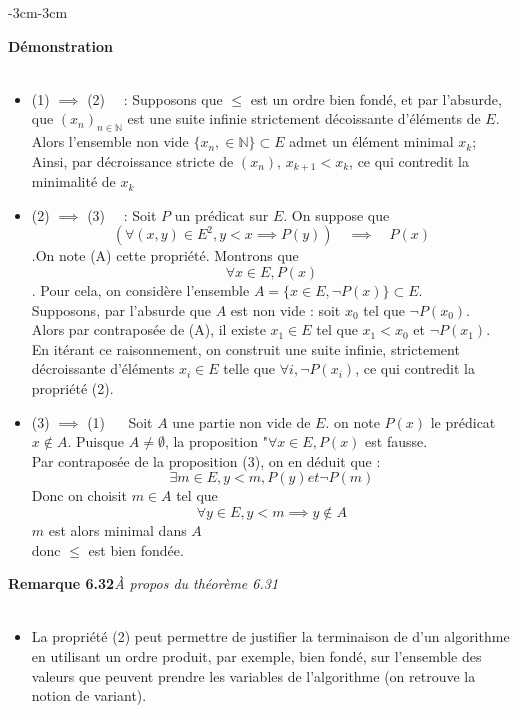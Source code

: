\documentclass{article}
\newenvironment{demonstration}
{
    \begin{boite_demonstration}
    \textbf{\textcolor{rouge_fonce}{Démonstration}}\\ \\
}
{
    \end{boite_demonstration}
    \vspace{15pt}
}
\newenvironment{remarque}[2]
{
    \begin{boite_remarque}
    \textbf{\textcolor{bleu_fonce}{Remarque #1}}\textit{#2} \\ \\
    \begin{itemize}[label=$\blacktriangleright \quad $ ]                    
}
{   
    \end{itemize}
    \end{boite_remarque}
    
}
\begin{document}
\begin{adjustwidth}{-3cm}{-3cm}
    \begin{demonstration}
        \begin{itemize}
            \item (1) $\implies$ (2) $\quad$: Supposons que $\leq$ est un ordre bien fondé, et par l'absurde, que $(x_n)_{n \in \mathbb{N}}$ est une suite infinie strictement décoissante d'éléments de $E$. Alors l'ensemble non vide $\{x_n, \in \mathbb{N}\} \subset E$ admet un élément minimal $x_k$; Ainsi, par décroissance stricte de $(x_n)$, $x_{k+1} < x_k$, ce qui contredit la minimalité de $x_k$
            \item (2) $\implies$ (3) $\quad$: Soit $P$ un prédicat sur $E$. On suppose que $$(\forall (x,y) \in E^2, y < x \implies P(y)) \quad \implies \quad P(x) $$.On note (A) cette propriété. Montrons que $$ \forall x \in E, P(x)$$. Pour cela, on considère l'ensemble $A = \{x \in E, \lnot P(x)\} \subset E$. \\ Supposons, par l'absurde que $A$ est non vide : soit $x_0$ tel que $\lnot P(x_0)$. \\ Alors par contraposée de (A), il existe $x_1 \in E$ tel que $x_1 < x_0$ et $\lnot P(x_1)$. \\En itérant ce raisonnement, on construit une suite infinie, strictement décroissante d'éléments $x_i \in E$ telle que $\forall i, \lnot P(x_i)$, ce qui contredit la propriété (2).
            \item (3) $\implies$ (1) $\quad$ Soit $A$ une partie non vide de $E$. on note $P(x)$ le prédicat $x \notin A$. Puisque $A \neq \emptyset$, la proposition "$\forall x \in E, P(x) $ est fausse. \\ Par contraposée de la proposition (3), on en déduit que : $$\exists m \in E, y<m, P(y) et \lnot P(m)$$ Donc on choisit $m \in A $ tel que $$\forall y \in E, y<m \implies y \notin A$$ $m$ est alors minimal dans $A$ \\ donc $\leq$ est bien fondée.
        \end{itemize}
    \end{demonstration}
    
        
        
        \begin{remarque}{6.32}{À propos du théorème 6.31}
            \item La propriété (2) peut permettre de justifier la terminaison de d'un algorithme en utilisant un ordre produit, par exemple, bien fondé, sur l'ensemble des valeurs que peuvent prendre les variables de l'algorithme (on retrouve la notion de variant).
        \end{remarque}


\end{adjustwidth}
\end{document}
